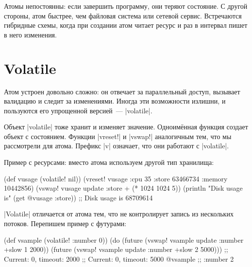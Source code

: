
Атомы непостоянны: если завершить программу, они теряют состояние. С другой
стороны, атом быстрее, чем файловая система или сетевой сервис. Встречаются
гибридные схемы, когда при создании атом читает ресурс и раз в интервал пишет в
него изменения.

\section{Volatile}


Атом устроен довольно сложно: он отвечает за параллельный доступ, вызывает
валидацию и следит за изменениями. Иногда эти возможности излишни, и пользуются
его упрощенной версией~--- \spverb|volatile|.


Объект \spverb|volatile| тоже хранит и изменяет значение. Одноим\"{е}нная функция
создает объект с состоянием. Функции \spverb|vreset!| и \spverb|vswap!|
аналогичным тем, что мы рассмотрели для атома. Префикс \spverb|v| означает, что
они работают с \spverb|volatile|.

Пример с ресурсами: вместо атома используем другой тип хранилища:

\begin{english}
  \begin{clojure}
(def vusage (volatile! nil))
(vreset! vusage
         {:cpu 35
          :store 63466734
          :memory 10442856})
(vswap! vusage update :store + (* 1024 1024 5))
(println "Disk usage is" (get @vusage :store))
;; Disk usage is 68709614
  \end{clojure}
\end{english}

\spverb|Volatile| отличается от атома тем, что не контролирует запись из
нескольких потоков. Перепишем пример с футурами:

\begin{english}
  \begin{clojure}
(def vsample (volatile! {:number 0}))
(do (future (vswap! vsample update :number +slow 1 2000))
    (future (vswap! vsample update :number +slow 2 5000)))
;; Current: 0, timeout: 2000
;; Current: 0, timeout: 5000
@vsample ;; {:number 2}
  \end{clojure}
\end{english}


